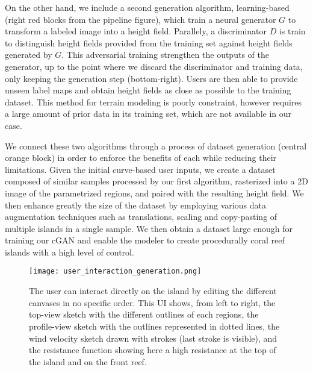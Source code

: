 On the other hand, we include a second generation algorithm, learning-based (right red blocks from the pipeline figure), which train a neural generator $G$ to transform a labeled image into a height field. Parallely, a discriminator $D$ is train to distinguish height fields provided from the training set against height fields generated by $G$. This adversarial training strengthen the outputs of the generator, up to the point where we discard the discriminator and training data, only keeping the generation step (bottom-right). Users are then able to provide unseen label maps and obtain height fields as close as possible to the training dataset. This method for terrain modeling is poorly constraint, however requires a large amount of prior data in its training set, which are not available in our case.

We connect these two algorithms through a process of dataset generation (central orange block) in order to enforce the benefits of each while reducing their limitations. Given the initial curve-based user inputs, we create a dataset composed of similar samples processed by our first algorithm, rasterized into a 2D image of the parametrized regions, and paired with the resulting height field. We then enhance greatly the size of the dataset by employing various data augmentation techniques such as translations, scaling and copy-pasting of multiple islands in a single sample. We then obtain a dataset large enough for training our cGAN and enable the modeler to create procedurally coral reef islands with a high level of control.


\begin{figure}[tb]
    \centering
    \texttt{[image: user\_interaction\_generation.png]}
    \caption{The user can interact directly on the island by editing the different canvases in no specific order. This UI shows, from left to right, the top-view sketch with the different outlines of each regions, the profile-view sketch with the outlines represented in dotted lines, the wind velocity sketch drawn with strokes (last stroke is visible), and the resistance function showing here a high resistance at the top of the island and on the front reef.}
    \label{fig:coral-island_wind-from-strokes-interaction}
\end{figure}


